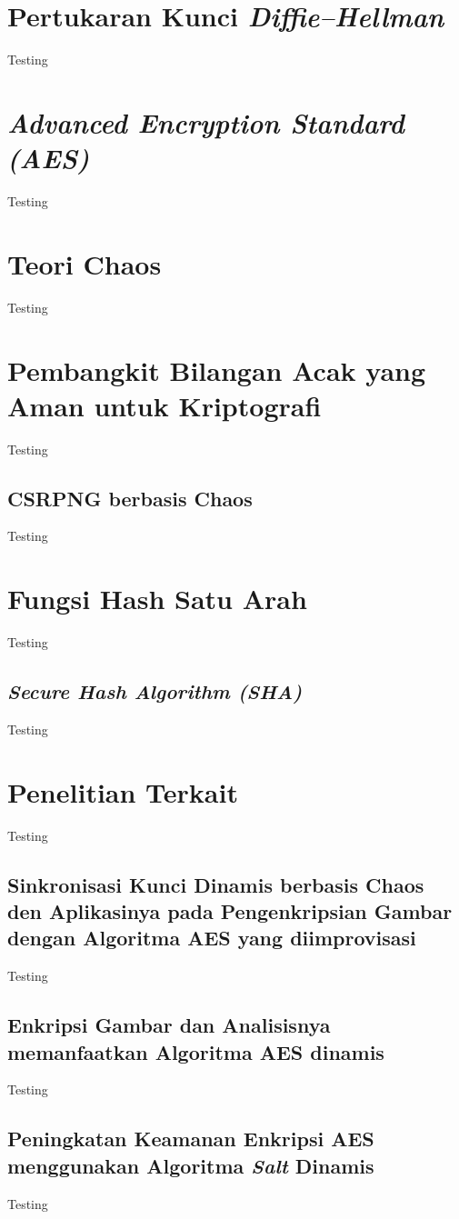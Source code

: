 \section{Pertukaran Kunci \emph{Diffie–Hellman}}
Testing 

\section{\emph{Advanced Encryption Standard (AES)}}
Testing

\section{Teori Chaos}
Testing

\section{Pembangkit Bilangan Acak yang Aman untuk Kriptografi}
Testing

\subsection{CSRPNG berbasis Chaos}
Testing

\section{Fungsi Hash Satu Arah}
Testing

\subsection{\emph{Secure Hash Algorithm (SHA)}}
Testing

\section{Penelitian Terkait}
Testing

\subsection{Sinkronisasi Kunci Dinamis berbasis Chaos den Aplikasinya pada Pengenkripsian Gambar dengan Algoritma AES yang diimprovisasi}
Testing

\subsection{Enkripsi Gambar dan Analisisnya memanfaatkan Algoritma AES dinamis}
Testing

\subsection{Peningkatan Keamanan Enkripsi AES menggunakan Algoritma \emph{Salt} Dinamis}
Testing
